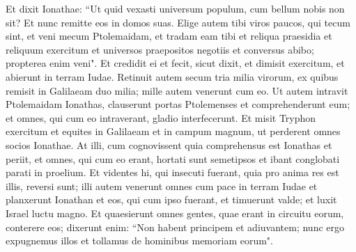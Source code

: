 \begin{biblechapter}
\verse Et dixit Ionathae: “Ut quid vexasti universum populum, cum bellum nobis non sit?  
\verse Et nunc remitte eos in domos suas. Elige autem tibi viros paucos, qui tecum sint, et veni mecum Ptolemaidam, et tradam eam tibi et reliqua praesidia et reliquum exercitum et universos praepositos negotiis et conversus abibo; propterea enim veni". 
\verse Et credidit ei et fecit, sicut dixit, et dimisit exercitum, et abierunt in terram Iudae. 
\verse Retinuit autem secum tria milia virorum, ex quibus remisit in Galilaeam duo milia; mille autem venerunt cum eo.  
\verse Ut autem intravit Ptolemaidam Ionathas, clauserunt portas Ptolemenses et comprehenderunt eum; et omnes, qui cum eo intraverant, gladio interfecerunt.  
\verse Et misit Tryphon exercitum et equites in Galilaeam et in campum magnum, ut perderent omnes socios Ionathae. 
\verse At illi, cum cognovissent quia comprehensus est Ionathas et periit, et omnes, qui cum eo erant, hortati sunt semetipsos et ibant conglobati parati in proelium. 
\verse Et videntes hi, qui insecuti fuerant, quia pro anima res est illis, reversi sunt; 
\verse illi autem venerunt omnes cum pace in terram Iudae et planxerunt Ionathan et eos, qui cum ipso fuerant, et timuerunt valde; et luxit Israel luctu magno. 
\verse Et quaesierunt omnes gentes, quae erant in circuitu eorum, conterere eos; dixerunt enim: 
\verse “Non habent principem et adiuvantem; nunc ergo expugnemus illos et tollamus de hominibus memoriam eorum". 
\end{biblechapter}

